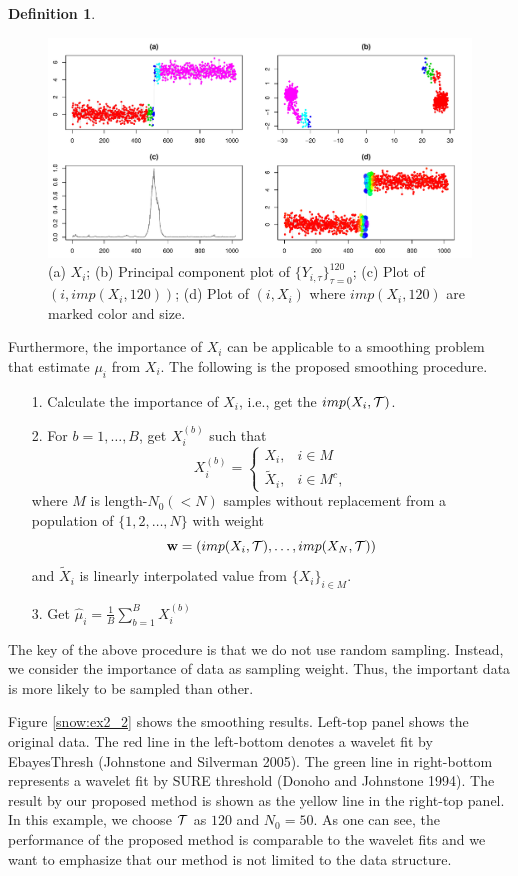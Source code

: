\documentclass[preprint, review, 12pt]{article}
\theoremstyle{definition}
\newtheorem{dfn}{Definition}
\theoremstyle{remark}
\begin{document}
\begin{dfn}
\begin{figure}
	\centering
	\includegraphics[width=1\textwidth]{Fig/snow_ex2_fig1.pdf}
	\caption{(a) $X_i$; (b) Principal component plot of $\{Y_{i,\tau}\}_{\tau=0}^{120}$; (c) Plot of $(i,imp(X_i,120))$; (d) Plot of $(i,X_i)$ where $imp(X_i,120)$ are marked color and size.}
	\label{snow:ex2_1}
\end{figure}

Furthermore, the importance of $X_i$ can be applicable to a smoothing problem that estimate $\mu_i$ from $X_i$. The following is the proposed smoothing procedure. 
\begin{itemize}
	\item[1. ] Calculate the importance of $X_i$, i.e., get the $imp(X_i,{\cal T})$. 
	\item[2. ] For $b=1,\dots,B$, get $X_i^{(b)}$ such that 
	\[
	X_i^{(b)}=\begin{cases} X_i, & i \in M \\ 
	\tilde{X}_i, & i \in M^c,
	\end{cases}
	\]
	where $M$ is length-$N_0(<N)$ samples without replacement from a population of $\{1,2,\dots,N\}$ with weight $$\mathbf{w}=\left(imp(X_i,{\cal T}),\dots,imp(X_N,{\cal T})\right)$$ and $\tilde{X}_i$ is linearly interpolated value from $\{X_i\}_{i\in M}$. 
	\item[3. ] Get $\hat{\mu}_i=\frac{1}{B}\sum_{b=1}^{B}X_i^{(b)}$ 
\end{itemize}
The key of the above procedure is that we do not use random sampling. Instead, we consider the importance of data as sampling weight. Thus, the important data is more likely to be sampled than other. 

Figure \ref{snow:ex2_2} shows the smoothing results. Left-top panel shows the original data. The red line in the left-bottom denotes a  wavelet fit by EbayesThresh (Johnstone and Silverman 2005). The green line in right-bottom represents a wavelet fit by SURE threshold (Donoho and Johnstone 1994). The result by our proposed method is shown as the yellow line in the right-top panel. In this example, we choose $\cal T$ as $120$ and $N_0=50$. As one can see, the performance of the proposed method is comparable to  the wavelet fits and we want to emphasize that our method is not limited to the data structure. 


\end{dfn}
\end{document}
